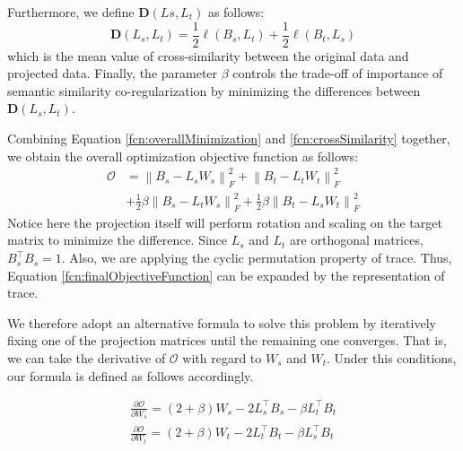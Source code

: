 Furthermore, we define $\mathbf{D}\left(L{s}, L_{t}\right)$ as follows:
\begin{equation}
\label{fcn:crossSimilarity}
    \mathbf{D}\left(L_{s}, L_{t}\right) =\frac{1}{2}\ell\left(B_s, L_{t}\right) + \frac{1}{2} \ell\left(B_t, L_{s}\right)
\end{equation}
which is the mean value of cross-similarity between the original data and projected data. Finally, the parameter $\beta$ controls the trade-off of importance of semantic similarity co-regularization by minimizing the differences between $\mathbf{D}(L_{s}, L_{t})$.

Combining Equation \ref{fcn:overallMinimization} and \ref{fcn:crossSimilarity} together, we obtain the overall optimization objective function as follows:
\begin{equation}
\label{fcn:finalObjectiveFunction}
\begin{split}
    \mathcal{O} &= \left \| B_s - L_{s}W_{s}  \right \|_{F}^2 + \left \| B_t - L_{t}W_{t}\right \|_{F}^2 \\
    &+ \frac{1}{2}\beta \left \| B_s - L_{t}W_{s}  \right \|_{F}^2 + \frac{1}{2}\beta \left \| B_t - L_{s}W_{t}\right \|_{F}^2
\end{split}
\end{equation}
Notice here the projection itself will perform rotation and scaling on the target matrix to minimize the difference.
Since $L_s$ and $L_t$ are orthogonal matrices, $B_{s}^{\top}B_{s}=1$. Also, we are applying the cyclic permutation property of trace. Thus, Equation \ref{fcn:finalObjectiveFunction} can be expanded by the representation of trace.

We therefore adopt an alternative formula to solve this problem by iteratively fixing one of the projection matrices until the remaining one converges. 
That is, we can take the derivative of $\mathcal{O}$ with regard to $W_s$ and $W_t$.
Under this conditions, our formula is defined as follows accordingly.

\begin{equation}
\begin{split}
    \frac{\partial \mathcal{O}}{\partial W_{s}} =  (2+\beta)W_{s} -2L_{s}^{\top}B_{s} - \beta L_{t}^{\top}B_{t} \\
    \frac{\partial \mathcal{O}}{\partial W_{t}} =  (2+\beta)W_{t} -2L_{t}^{\top}B_{t} - \beta L_{s}^{\top}B_{t} \\
\end{split}
\end{equation}

